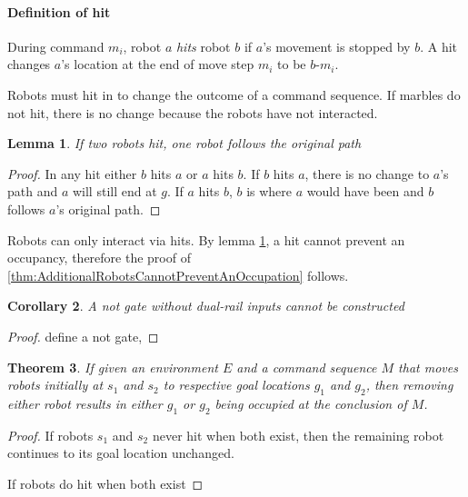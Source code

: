 \documentclass[letterpaper, 10 pt, conference]{ieeeconf}
\newcommand{\todo}[1]{\vspace{5 mm}\par \noindent \framebox{\begin{minipage}[c]{0.98 \columnwidth} \ttfamily\flushleft \textcolor{red}{#1}\end{minipage}}\vspace{5 mm}\par}
\newtheorem{theorem}{Theorem}
\newtheorem{lemma}[theorem]{Lemma}
\newtheorem{corollary}[theorem]{Corollary}
\begin{document}
\paragraph{Definition of hit}
During command $m_i$, robot $a$ \emph{hits} robot $b$ if $a$'s movement is stopped by $b$.  A hit changes $a$'s location at the end of move step $m_i$ to be $b$-$m_i$.  

Robots must hit in to change the outcome of a command sequence.
If marbles do not hit, there is no change because the robots have not interacted.

\begin{lemma}\label{lemma:AHitDoesntChangeOccupancyDuringMove}
If two robots hit, one robot follows the original path \todo{need to specify path and original path.  Maybe: ``one robot follows the path either robot would have followed if the other did not exist"  or If robots $a$ and $b$ hit, a robot will still occupy $m$...}
\end{lemma}
\begin{proof}
In any hit either $b$ hits $a$ or $a$ hits $b$.  If $b$ hits $a$,  there is no change to $a$'s path and $a$ will still end at $g$.  If $a$ hits $b$, $b$ is where $a$ would have been and $b$ follows $a$'s original path.   
\end{proof}

Robots can only interact via hits.  By lemma \ref{lemma:AHitDoesntChangeOccupancyDuringMove}, a hit cannot prevent an occupancy, therefore the proof of \ref{thm:AdditionalRobotsCannotPreventAnOccupation} follows.

\begin{corollary}
A  {\sc not} gate without dual-rail inputs cannot be constructed
\end{corollary}
\begin{proof}
define a {\sc not} gate, \todo{explain how this follows} 
\end{proof}



\begin{theorem}\label{thm:TwoRobotsTwoGoalsImpliesOneRobotOneGoal} 
If given an environment $E$ and a command sequence $M$ that moves robots initially at $s_1$ and $s_2$ to respective goal locations $g_1$ and $g_2$, then removing either robot results in either $g_1$ or $g_2$ being occupied at the conclusion of $M$.
\end{theorem}

\begin{proof}
If robots $s_1$ and $s_2$ never hit when both exist, then the remaining robot continues to its goal location unchanged.

If robots do hit when both exist \todo{show that this cannot lead to a goal location $g_3$, when only one robot is used, it goes to the goal location occupied by the last robot to be hit when there are two. }
\end{proof}
\end{document}
